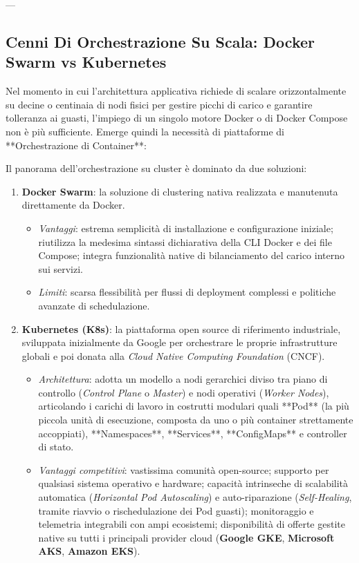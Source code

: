 \documentclass[11pt, a4paper]{article}
\begin{document}
---

\subsection{Cenni Di Orchestrazione Su Scala: Docker Swarm vs Kubernetes}

Nel momento in cui l'architettura applicativa richiede di scalare orizzontalmente su decine o centinaia di nodi fisici per gestire picchi di carico e garantire tolleranza ai guasti, l'impiego di un singolo motore Docker o di Docker Compose non è più sufficiente. Emerge quindi la necessità di piattaforme di **Orchestrazione di Container**:


Il panorama dell'orchestrazione su cluster è dominato da due soluzioni:
\begin{enumerate}
    \item \textbf{Docker Swarm}: la soluzione di clustering nativa realizzata e manutenuta direttamente da Docker.
    \begin{itemize}
        \item \emph{Vantaggi}: estrema semplicità di installazione e configurazione iniziale; riutilizza la medesima sintassi dichiarativa della CLI Docker e dei file Compose; integra funzionalità native di bilanciamento del carico interno sui servizi.
        \item \emph{Limiti}: scarsa flessibilità per flussi di deployment complessi e politiche avanzate di schedulazione.
    \end{itemize}
    \item \textbf{Kubernetes (K8s)}: la piattaforma open source di riferimento industriale, sviluppata inizialmente da Google per orchestrare le proprie infrastrutture globali e poi donata alla \emph{Cloud Native Computing Foundation} (CNCF).
    \begin{itemize}
        \item \emph{Architettura}: adotta un modello a nodi gerarchici diviso tra piano di controllo (\emph{Control Plane} o \emph{Master}) e nodi operativi (\emph{Worker Nodes}), articolando i carichi di lavoro in costrutti modulari quali **Pod** (la più piccola unità di esecuzione, composta da uno o più container strettamente accoppiati), **Namespaces**, **Services**, **ConfigMaps** e controller di stato.
        \item \emph{Vantaggi competitivi}: vastissima comunità open-source; supporto per qualsiasi sistema operativo e hardware; capacità intrinseche di scalabilità automatica (\emph{Horizontal Pod Autoscaling}) e auto-riparazione (\emph{Self-Healing}, tramite riavvio o rischedulazione dei Pod guasti); monitoraggio e telemetria integrabili con ampi ecosistemi; disponibilità di offerte gestite native su tutti i principali provider cloud (\textbf{Google GKE}, \textbf{Microsoft AKS}, \textbf{Amazon EKS}).
    \end{itemize}
\end{enumerate}
\end{document}
